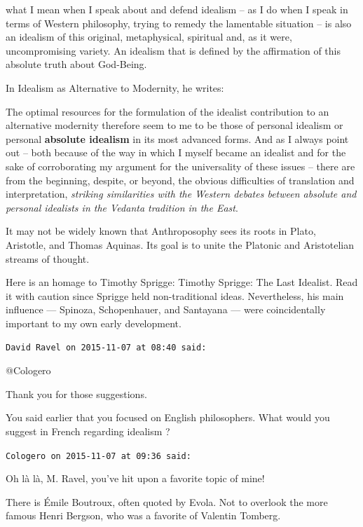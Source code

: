 \begin{footnotesize}
\begin{sffamily}
\begin{quotex}
what I mean when I speak about and defend idealism – as I do when I speak in terms of Western philosophy, trying to
remedy the lamentable situation – is also an idealism of this original, metaphysical, spiritual and, as it were,
uncompromising variety. An idealism that is defined by the affirmation of this absolute truth about God-Being.

\end{quotex}
In Idealism as Alternative to Modernity, he writes:

\begin{quotex}
The optimal resources for the formulation of the idealist contribution to an alternative modernity therefore seem to me
to be those of personal idealism or personal \textbf{absolute idealism} in its most advanced forms. And as I always
point out – both because of the way in which I myself became an idealist and for the sake of corroborating my argument
for the universality of these issues – there are from the beginning, despite, or beyond, the obvious difficulties of
translation and interpretation, \emph{striking similarities with the Western debates between absolute and personal
idealists in the Vedanta tradition in the East}. 

\end{quotex}
It may not be widely known that Anthroposophy sees its roots in Plato, Aristotle, and Thomas Aquinas. Its goal is to
unite the Platonic and Aristotelian streams of thought.

Here is an homage to Timothy Sprigge: Timothy Sprigge: The Last Idealist. Read it with caution since Sprigge held
non-traditional ideas. Nevertheless, his main influence — Spinoza, Schopenhauer, and Santayana — were coincidentally important to my own early development.


\hfill

\texttt{David Ravel on 2015-11-07 at 08:40 said: }

@Cologero

Thank you for those suggestions.

You said earlier that you focused on English philosophers. What would you suggest in French regarding idealism ?


\hfill

\texttt{Cologero on 2015-11-07 at 09:36 said: }

Oh là là, M. Ravel, you've hit upon a favorite topic of mine!

There is Émile Boutroux, often quoted by Evola. Not to overlook the more famous Henri Bergson, who was a favorite of
Valentin Tomberg.


\end{sffamily}
\end{footnotesize}
